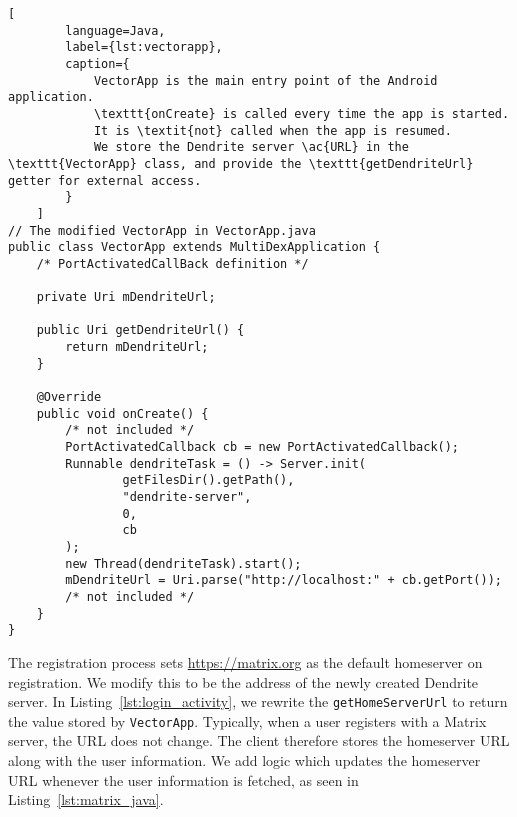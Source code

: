 \begin{lstfloat}
	\begin{lstlisting}[
        language=Java,
        label={lst:vectorapp},
        caption={
            VectorApp is the main entry point of the Android application.
            \texttt{onCreate} is called every time the app is started.
            It is \textit{not} called when the app is resumed.
            We store the Dendrite server \ac{URL} in the \texttt{VectorApp} class, and provide the \texttt{getDendriteUrl} getter for external access.
        }
    ]
// The modified VectorApp in VectorApp.java
public class VectorApp extends MultiDexApplication {
    /* PortActivatedCallBack definition */

    private Uri mDendriteUrl;

    public Uri getDendriteUrl() {
        return mDendriteUrl;
    }

    @Override
    public void onCreate() {
        /* not included */
        PortActivatedCallback cb = new PortActivatedCallback();
        Runnable dendriteTask = () -> Server.init(
                getFilesDir().getPath(),
                "dendrite-server",
                0,
                cb
        );
        new Thread(dendriteTask).start();
        mDendriteUrl = Uri.parse("http://localhost:" + cb.getPort());
        /* not included */
    }
}
\end{lstlisting}
\end{lstfloat}

The registration process sets \url{https://matrix.org} as the default homeserver on registration.
We modify this to be the address of the newly created Dendrite server.
In Listing~\ref{lst:login_activity}, we rewrite the \texttt{getHomeServerUrl} to return the value stored by \texttt{VectorApp}.
Typically, when a user registers with a Matrix server, the \ac{URL} does not change.
The client therefore stores the homeserver \ac{URL} along with the user information.
We add logic which updates the homeserver \ac{URL} whenever the user information is fetched, as seen in Listing~\ref{lst:matrix_java}.

